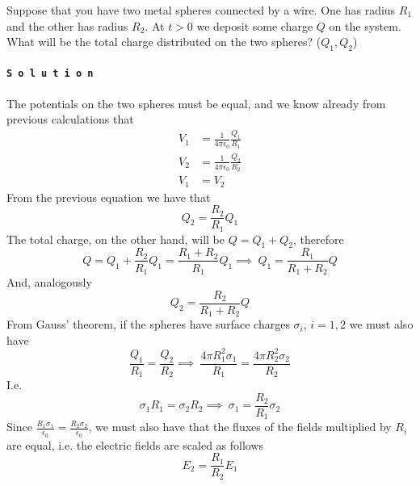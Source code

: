 \documentclass[../electromagnetism]{subfiles}
\begin{document}
\begin{exe}
	Suppose that you have two metal spheres connected by a wire. One has radius $R_1$ and the other has radius $R_2$. At $t>0$ we deposit some charge $Q$ on the system. What will be the total charge distributed on the two spheres? ($Q_1,Q_2$)\\\\
	\texttt{\textbf{S o l u t i o n}}\\\\
	The potentials on the two spheres must be equal, and we know already from previous calculations that
	\begin{equation}
		\begin{aligned}
			V_1&=\frac{1}{4\pi\epsilon_0}\frac{Q_1}{R_1}\\
			V_2&=\frac{1}{4\pi\epsilon_0}\frac{Q_2}{R_2}\\
			V_1&=V_2
		\end{aligned}
		\label{eq:spherepot}
	\end{equation}
	From the previous equation we have that
	\begin{equation}
		Q_2=\frac{R_2}{R_1}Q_1
		\label{eq:q2}
	\end{equation}
	The total charge, on the other hand, will be $Q=Q_1+Q_2$, therefore
	\begin{equation}
		Q=Q_1+\frac{R_2}{R_1}Q_1=\frac{R_1+R_2}{R_1}Q_1\implies\ Q_1=\frac{R_1}{R_1+R_2}Q
		\label{eq:totalcharge1}
	\end{equation}
	And, analogously
	\begin{equation}
		Q_2=\frac{R_2}{R_1+R_2}Q
		\label{eq:totalcharge2}
	\end{equation}
	From Gauss' theorem, if the spheres have surface charges $\sigma_i$, $i=1,2$ we must also have
	\begin{equation}
		\frac{Q_1}{R_1}=\frac{Q_2}{R_2}\implies\ \frac{4\pi R^2_1\sigma_1}{R_1}=\frac{4\pi R_2^2\sigma_2}{R_2}
		\label{eq:gausslaw}
	\end{equation}
	I.e.
	\begin{equation*}
		\sigma_1R_1=\sigma_2R_2\implies\ \sigma_1=\frac{R_2}{R_1}\sigma_2
	\end{equation*}
	Since $\frac{R_1\sigma_1}{\epsilon_0}=\frac{R_2\sigma_2}{\epsilon_0}$, we must also have that the fluxes of the fields multiplied by $R_i$ are equal, i.e. the electric fields are scaled as follows
	\begin{equation}
		E_2=\frac{R_1}{R_2}E_1
		\label{eq:efield2spheres}
	\end{equation}
	\hfill\square
\end{exe}
\end{document}
